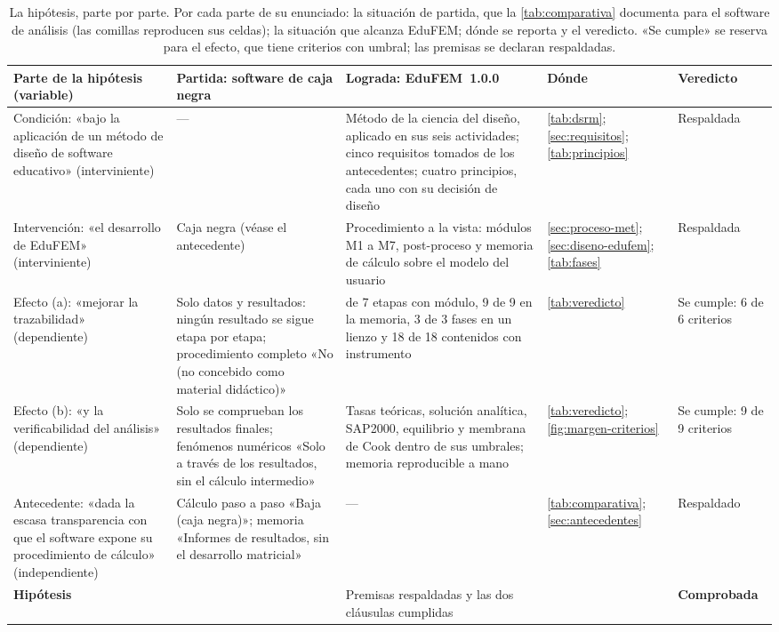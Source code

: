 \begin{table}[htbp]
\centering
\caption[La hipótesis, parte por parte: partida, logro y veredicto.]{La hipótesis, parte por parte. Por cada parte de su enunciado: la situación de partida, que la \autoref{tab:comparativa} documenta para el software de análisis (las comillas reproducen sus celdas); la situación que alcanza EduFEM; dónde se reporta y el veredicto. «Se cumple» se reserva para el efecto, que tiene criterios con umbral; las premisas se declaran respaldadas.}
\label{tab:componentes-hipotesis}
{\footnotesize
\setlength{\tabcolsep}{3pt}
\renewcommand{\arraystretch}{1.15}
\begin{tabular}{@{}>{\raggedright\arraybackslash}p{3.1cm}>{\raggedright\arraybackslash}p{3.3cm}>{\raggedright\arraybackslash}p{4.1cm}>{\raggedright\arraybackslash}p{2.5cm}>{\raggedright\arraybackslash}p{2.0cm}@{}}
\toprule
\textbf{Parte de la hipótesis (variable)} & \textbf{Partida: software de caja negra} & \textbf{Lograda: EduFEM~1.0.0} & \textbf{Dónde} & \textbf{Veredicto} \\
\midrule
Condición: «bajo la aplicación de un método de diseño de software educativo» (interviniente) & --- & Método de la ciencia del diseño, aplicado en sus seis actividades; cinco requisitos tomados de los antecedentes; cuatro principios, cada uno con su decisión de diseño & \autoref{tab:dsrm}; \autoref{sec:requisitos}; \autoref{tab:principios} & Respaldada \\
Intervención: «el desarrollo de EduFEM» (interviniente) & Caja negra (véase el antecedente) & Procedimiento a la vista: módulos M1 a M7, post-proceso y memoria de cálculo sobre el modelo del usuario & \autoref{sec:proceso-met}; \autoref{sec:diseno-edufem}; \autoref{tab:fases} & Respaldada \\
Efecto (a): «mejorar la trazabilidad» (dependiente) & Solo datos y resultados: ningún resultado se sigue etapa por etapa; procedimiento completo «No (no concebido como material didáctico)» & 7 de 7 etapas con módulo, 9 de 9 en la memoria, 3 de 3 fases en un lienzo y 18 de 18 contenidos con instrumento & \autoref{tab:veredicto} & Se cumple: 6 de 6 criterios \\
Efecto (b): «y la verificabilidad del análisis» (dependiente) & Solo se comprueban los resultados finales; fenómenos numéricos «Solo a través de los resultados, sin el cálculo intermedio» & Tasas teóricas, solución analítica, SAP2000, equilibrio y membrana de Cook dentro de sus umbrales; memoria reproducible a mano & \autoref{tab:veredicto}; \autoref{fig:margen-criterios} & Se cumple: 9 de 9 criterios \\
Antecedente: «dada la escasa transparencia con que el software expone su procedimiento de cálculo» (independiente) & Cálculo paso a paso «Baja (caja negra)»; memoria «Informes de resultados, sin el desarrollo matricial» & --- & \autoref{tab:comparativa}; \autoref{sec:antecedentes} & Respaldado \\
\midrule
\textbf{Hipótesis} & & Premisas respaldadas y las dos cláusulas cumplidas & & \textbf{Comprobada} \\
\bottomrule
\end{tabular}}
\end{table}

